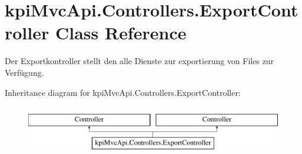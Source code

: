 \hypertarget{classkpi_mvc_api_1_1_controllers_1_1_export_controller}{}\section{kpi\+Mvc\+Api.\+Controllers.\+Export\+Controller Class Reference}
\label{classkpi_mvc_api_1_1_controllers_1_1_export_controller}


Der Exportkontroller stellt den alle Dienste zur exportierung von Files zur Verfügung.  


Inheritance diagram for kpi\+Mvc\+Api.\+Controllers.\+Export\+Controller\+:\begin{figure}[H]
\begin{center}
\leavevmode
\includegraphics[height=2.000000cm]{classkpi_mvc_api_1_1_controllers_1_1_export_controller}
\end{center}
\end{figure}
